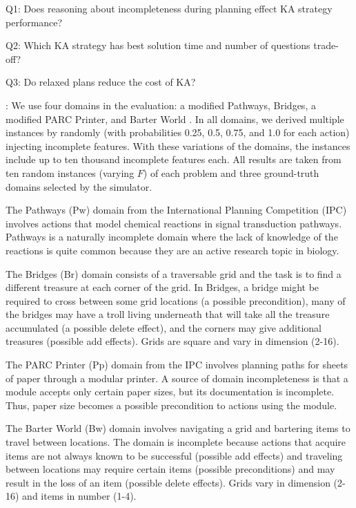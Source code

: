 \documentclass{article}
\def\und#1{\noindent{\bf #1}:}
\def\citep#1{\cite{#1}}
\newenvironment{packed_itemize}{
\begin{itemize}
  \setlength{\itemsep}{1pt}
  \setlength{\parskip}{0pt}
  \setlength{\parsep}{0pt}
}{\end{itemize}}
\begin{document}
\begin{packed_itemize}
  \item Q1: Does reasoning about incompleteness during planning 
  effect KA strategy performance?
  \item Q2: Which KA strategy has best solution time and
  number of questions trade-off?
  \item Q3: Do relaxed plans reduce the cost of KA?
\end{packed_itemize}



\und{Domains} We use four domains in the evaluation: a modified Pathways,
Bridges,  a modified PARC Printer, and Barter World \citep{bryce-icaps11}.  In
all domains, we derived multiple instances by randomly (with probabilities 0.25,
0.5, 0.75, and 1.0 for each action) injecting incomplete  features.   
With these variations of the domains, the instances include up to ten thousand
incomplete  features each. All results are taken from ten random instances
(varying $F$) of each problem and three ground-truth domains selected by the
simulator.

The Pathways (Pw) domain from the International Planning Competition  (IPC) involves actions that model chemical reactions in signal
transduction pathways.  Pathways is a naturally incomplete domain where the lack
of knowledge of the reactions is quite common because they are an active
research topic in biology.  

The Bridges (Br) domain consists of a traversable grid and the task is to find a
different treasure at each corner of the grid. In Bridges,
a bridge might be required  to cross between some grid locations (a possible
precondition), many of the bridges may have a troll living
underneath that will take all the treasure accumulated (a possible delete
effect), and the corners may give additional treasures (possible add
effects).  Grids are square and vary in dimension (2-16).

The PARC Printer (Pp) domain from the IPC involves planning paths for sheets of
paper through a modular printer.  A source of domain incompleteness is that a module
accepts only certain paper sizes, but its documentation is incomplete.  Thus,
paper size becomes a possible precondition to actions using the module.

The Barter World (Bw) domain involves navigating a grid and bartering items to
travel between locations.  The domain is incomplete because actions that acquire
 items are not always known to be successful (possible add effects) and traveling between locations may require
certain items (possible preconditions) and may result in the loss of an item
(possible delete effects). Grids vary in dimension (2-16) and items
in number (1-4).
\end{document}
